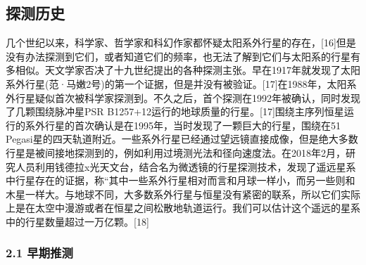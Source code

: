 \subsection{探测历史}
几个世纪以来，科学家、哲学家和科幻作家都怀疑太阳系外行星的存在，[16]但是没有办法探测到它们，或者知道它们的频率，也无法了解到它们与太阳系的行星有多相似。天文学家否决了十九世纪提出的各种探测主张。早在1917年就发现了太阳系外行星(范·马嫩2号)的第一个证据，但是并没有被验证。[17]在1988年，太阳系外行星疑似首次被科学家探测到。不久之后，首个探测在1992年被确认，同时发现了几颗围绕脉冲星PSR B1257+12运行的地球质量的行星。[17]围绕主序列恒星运行的系外行星的首次确认是在1995年，当时发现了一颗巨大的行星，围绕在51 Pegasi星的四天轨道附近。一些系外行星已经通过望远镜直接成像，但是绝大多数行星是被间接地探测到的，例如利用过境测光法和径向速度法。在2018年2月，研究人员利用钱德拉x光天文台，结合名为微透镜的行星探测技术，发现了遥远星系中行星存在的证据，称“其中一些系外行星相对而言和月球一样小，而另一些则和木星一样大。与地球不同，大多数系外行星与恒星没有紧密的联系，所以它们实际上是在太空中漫游或者在恒星之间松散地轨道运行。我们可以估计这个遥远的星系中的行星数量超过一万亿颗。[18]
\subsubsection{2.1 早期推测}